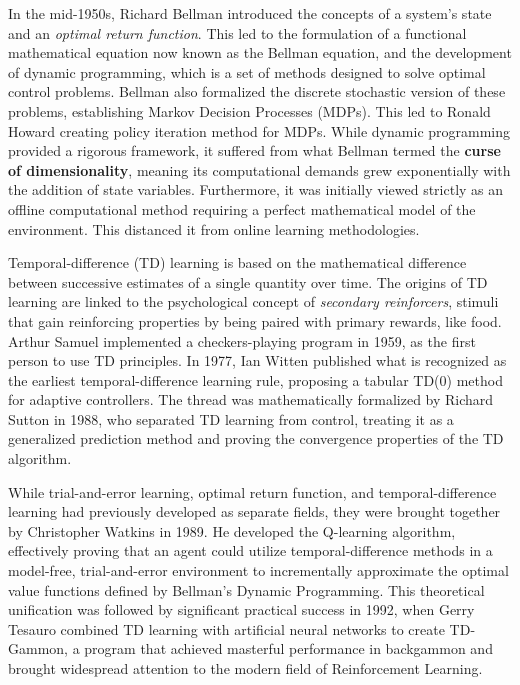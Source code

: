  
In the mid-1950s, Richard Bellman introduced the concepts of a system's state and an \textit{optimal return function}. This led to the formulation of a functional mathematical equation now known as the Bellman equation, and the development of dynamic programming, which is a set of methods designed to solve optimal control problems. Bellman also formalized the discrete stochastic version of these problems, establishing Markov Decision Processes (MDPs). This led to Ronald Howard creating policy iteration method for MDPs. While dynamic programming provided a rigorous framework, it suffered from what Bellman termed the \textbf{curse of dimensionality}, meaning its computational demands grew exponentially with the addition of state variables. Furthermore, it was initially viewed strictly as an offline computational method requiring a perfect mathematical model of the environment. This distanced it from online learning methodologies.
 
Temporal-difference (TD) learning is based on the mathematical difference between successive estimates of a single quantity over time. The origins of TD learning are linked to the psychological concept of \textit{secondary reinforcers}, stimuli that gain reinforcing properties by being paired with primary rewards, like food. Arthur Samuel implemented a checkers-playing program in 1959, as the first person to use TD principles. In 1977, Ian Witten published what is recognized as the earliest temporal-difference learning rule, proposing a tabular TD(0) method for adaptive controllers. The thread was mathematically formalized by Richard Sutton in 1988, who separated TD learning from control, treating it as a generalized prediction method and proving the convergence properties of the TD algorithm.
 
 
While trial-and-error learning, optimal return function, and temporal-difference learning had previously developed as separate fields, they were brought together by Christopher Watkins in 1989. He developed the Q-learning algorithm, effectively proving that an agent could utilize temporal-difference methods in a model-free, trial-and-error environment to incrementally approximate the optimal value functions defined by Bellman's Dynamic Programming. This theoretical unification was followed by significant practical success in 1992, when Gerry Tesauro combined TD learning with artificial neural networks to create TD-Gammon, a program that achieved masterful performance in backgammon and brought widespread attention to the modern field of Reinforcement Learning. \cite{Reinforcement_learning_book} 
 
